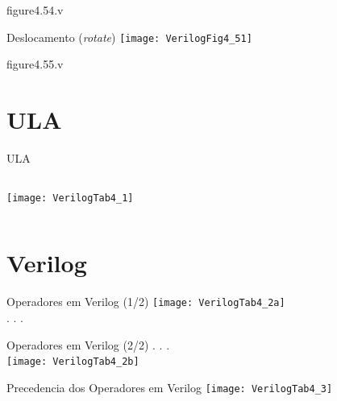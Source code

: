 \begin{frame}[fragile]{figure4.54.v}
\end{frame} 

\begin{frame}{Deslocamento (\textit{rotate})} \centering
    \texttt{[image: VerilogFig4\_51]}
\end{frame}

\begin{frame}[fragile]{figure4.55.v}
\end{frame} 

\section{ULA}

\begin{frame}{ULA}
    \begin{columns}
        \begin{column}{0.40\textwidth} \centering
            \texttt{[image: VerilogTab4\_1]} 
        \end{column}
        \pause
        \begin{column}{0.60\textwidth}
        \end{column}    
    \end{columns}    
\end{frame}

\section{Verilog}

\begin{frame}{Operadores em Verilog (1/2)} \centering
    \texttt{[image: VerilogTab4\_2a]} \\
    . . .
\end{frame}

\begin{frame}{Operadores em Verilog (2/2)} \centering
    . . . \\ 
    \vspace{0.3cm}
    \texttt{[image: VerilogTab4\_2b]} 
\end{frame}

\begin{frame}{Precedencia dos Operadores em Verilog} \centering
    \texttt{[image: VerilogTab4\_3]} 
\end{frame}

